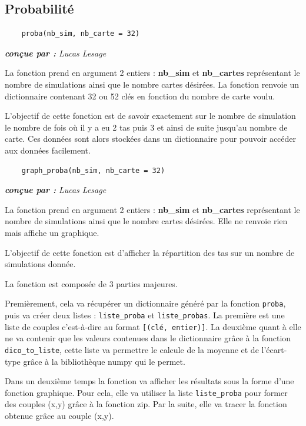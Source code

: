 \documentclass[titlepage]{article}
\begin{document}
\subsection{Probabilité}
\noindent	\begin{minipage}{\textwidth}
	\begin{lstlisting}
	proba(nb_sim, nb_carte = 32)
	\end{lstlisting}	
	\end{minipage}

\emph{\textbf{conçue par : } Lucas Lesage} \vspace{2mm}\par

La fonction prend en argument 2 entiers : \textbf{nb\_sim} et \textbf{nb\_cartes} représentant le nombre de simulations ainsi que le nombre cartes désirées.  La fonction renvoie un dictionnaire contenant 32 ou 52 clés en fonction du nombre de carte voulu. \vspace{1mm}\par

L’objectif de cette fonction est de savoir exactement sur le nombre de simulation le nombre de fois où il y a eu 2 tas puis 3 et ainsi de suite jusqu’au nombre de carte. Ces données sont alors stockées dans un dictionnaire pour pouvoir accéder aux données facilement. \vspace{5mm}

\noindent	\begin{minipage}{\textwidth}
	\begin{lstlisting}
	graph_proba(nb_sim, nb_carte = 32)
	\end{lstlisting}	
	\end{minipage}

\emph{\textbf{conçue par : } Lucas Lesage} \vspace{2mm}\par

La fonction prend en argument 2 entiers : \textbf{nb\_sim} et \textbf{nb\_cartes} représentant le nombre de simulations ainsi que le nombre cartes désirées.  Elle ne renvoie rien mais affiche un graphique.

L’objectif de cette fonction est d’afficher la répartition des tas sur un nombre de simulations donnée. \par
La fonction est composée de 3 parties majeures. \par
Premièrement, cela va récupérer un dictionnaire généré par la fonction \texttt{proba}, puis va créer deux listes : \texttt{liste\_proba} et \texttt{liste\_probas}. La première est une liste de couples c’est-à-dire au format \texttt{[(clé, entier)]}. La deuxième quant à elle ne va contenir que les valeurs contenues dans le dictionnaire grâce à la fonction \texttt{dico\_to\_liste}, cette liste va permettre le calcule de la moyenne et de l’écart-type grâce à la bibliothèque numpy qui le permet. \par
Dans un deuxième temps la fonction va afficher les résultats sous la forme d’une fonction graphique. Pour cela, elle va utiliser la liste \texttt{liste\_proba} pour former des couples (x,y) grâce à la fonction zip. Par la suite, elle va tracer la fonction obtenue grâce au couple (x,y).\par
\end{document}
